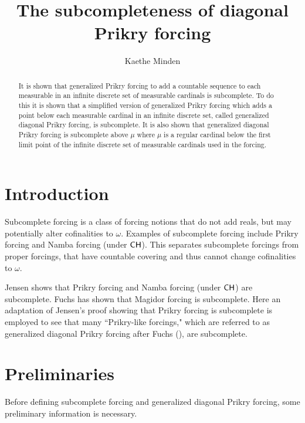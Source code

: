 \documentclass{amsart}
\theoremstyle{definition}
\theoremstyle{remark}
\newcommand{\CH}{\textup{\textsf{CH}}}
\begin{document}
\title{The subcompleteness of diagonal Prikry forcing}

\author[Minden]{Kaethe Minden}
 \address[K.~Minden]{Mathematics, Marlboro College, 2582 South Road, Marlboro, VT 05344}
\date{}     					

\begin{abstract}
It is shown that generalized Prikry forcing to add a countable sequence to each measurable in an infinite discrete set of measurable cardinals is subcomplete. To do this it is shown that a simplified version of generalized Prikry forcing which adds a point below each measurable cardinal in an infinite discrete set, called generalized diagonal Prikry forcing, is subcomplete. It is also shown that generalized diagonal Prikry forcing is subcomplete above $\mu$ where $\mu$ is a regular cardinal below the first limit point of the infinite discrete set of measurable cardinals used in the forcing.
\end{abstract}
\maketitle

\section{Introduction}
Subcomplete forcing is a class of forcing notions that do not add reals, but may potentially alter cofinalities to $\omega$. Examples of subcomplete forcing include Prikry forcing and Namba forcing (under $\CH$). This separates subcomplete forcings from proper forcings, that have countable covering and thus cannot change cofinalities to $\omega$. 

Jensen \cite[Section 3.3]{Jensen:2012fr} shows that Prikry forcing and Namba forcing (under $\CH$) are subcomplete. Fuchs has shown that Magidor forcing \cite{Fuchs:2017Magidor} is subcomplete. Here an adaptation of Jensen's proof showing that Prikry forcing is subcomplete is employed to see that many ``Prikry-like forcings," which are referred to as generalized diagonal Prikry forcing after Fuchs (\cite{Fuchs:2005kx}), are subcomplete.

\section{Preliminaries}
Before defining subcomplete forcing and generalized diagonal Prikry forcing, some preliminary information is necessary. 
\end{document}
